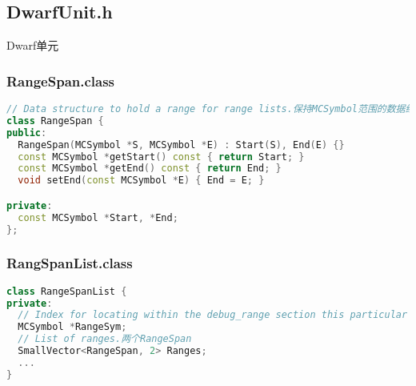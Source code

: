 \documentclass{ctexart}
\begin{document}
\subsection{DwarfUnit.h}
Dwarf单元


\subsubsection{RangeSpan.class}
\begin{lstlisting}[language=C++]
// Data structure to hold a range for range lists.保持MCSymbol范围的数据结构
class RangeSpan {
public:
  RangeSpan(MCSymbol *S, MCSymbol *E) : Start(S), End(E) {}
  const MCSymbol *getStart() const { return Start; }
  const MCSymbol *getEnd() const { return End; }
  void setEnd(const MCSymbol *E) { End = E; }

private:
  const MCSymbol *Start, *End;
};
\end{lstlisting}

\subsubsection{RangSpanList.class}
\begin{lstlisting}[language=C++]
class RangeSpanList {
private:
  // Index for locating within the debug_range section this particular span.索引定位
  MCSymbol *RangeSym;
  // List of ranges.两个RangeSpan
  SmallVector<RangeSpan, 2> Ranges;
  ...
}
\end{lstlisting}
\end{document}
